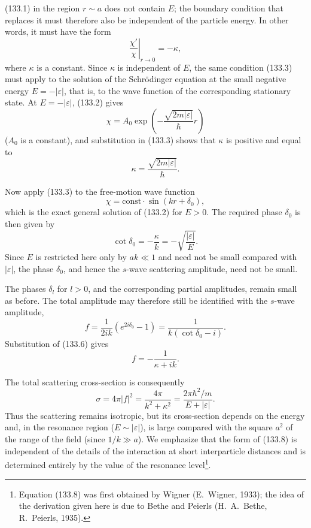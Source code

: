 (133.1) in the region $r\sim a$ does not contain $E$; the boundary condition
that replaces it must therefore also be independent of the particle energy.
In other words, it must have the form
\begin{equation}
 \left.\frac{\chi'}\chi\right|_{r\to0}=-\kappa,
 \tag{133.3}
\end{equation}
where $\kappa$ is a constant. Since $\kappa$ is independent of $E$, the same
condition (133.3) must apply to the solution of the Schrödinger equation at
the small negative energy $E=-|\varepsilon|$, that is, to the wave function
of the corresponding stationary state. At $E=-|\varepsilon|$, (133.2) gives
\begin{equation}
 \chi=A_0\exp\left(-\frac{\sqrt{2m|\varepsilon|}}\hbar r\right)
 \tag{133.4}
\end{equation}
($A_0$ is a constant), and substitution in (133.3) shows that $\kappa$ is
positive and equal to
\begin{equation}
 \kappa=\frac{\sqrt{2m|\varepsilon|}}\hbar.
 \tag{133.5}
\end{equation}

Now apply (133.3) to the free-motion wave function
\[
 \chi=\mathrm{const}\cdot\sin(kr+\delta_0),
\]
which is the exact general solution of (133.2) for $E>0$. The required phase
$\delta_0$ is then given by
\begin{equation}
 \cot\delta_0=-\frac{\kappa}{k}=-\sqrt{\frac{|\varepsilon|}{E}}.
 \tag{133.6}
\end{equation}
Since $E$ is restricted here only by $ak\ll1$ and need not be small compared
with $|\varepsilon|$, the phase $\delta_0$, and hence the $s$-wave scattering
amplitude, need not be small.

The phases $\delta_l$ for $l>0$, and the corresponding partial amplitudes,
remain small as before. The total amplitude may therefore still be identified
with the $s$-wave amplitude,
\[
 f=\frac1{2ik}(e^{2i\delta_0}-1)=\frac1{k(\cot\delta_0-i)}.
\]
Substitution of (133.6) gives
\begin{equation}
 f=-\frac1{\kappa+ik}.
 \tag{133.7}
\end{equation}

The total scattering cross-section is consequently
\begin{equation}
 \sigma=4\pi|f|^2=\frac{4\pi}{k^2+\kappa^2}
 =\frac{2\pi\hbar^2/m}{E+|\varepsilon|}.
 \tag{133.8}
\end{equation}
Thus the scattering remains isotropic, but its cross-section depends on the
energy and, in the resonance region ($E\sim|\varepsilon|$), is large compared
with the square $a^2$ of the range of the field (since $1/k\gg a$). We
emphasize that the form of (133.8) is independent of the details of the
interaction at short interparticle distances and is determined entirely by
the value of the resonance level\footnote{Equation (133.8) was first obtained
by Wigner (E.~Wigner, 1933); the idea of the derivation given here is due to
Bethe and Peierls (H.~A.~Bethe, R.~Peierls, 1935).}.


